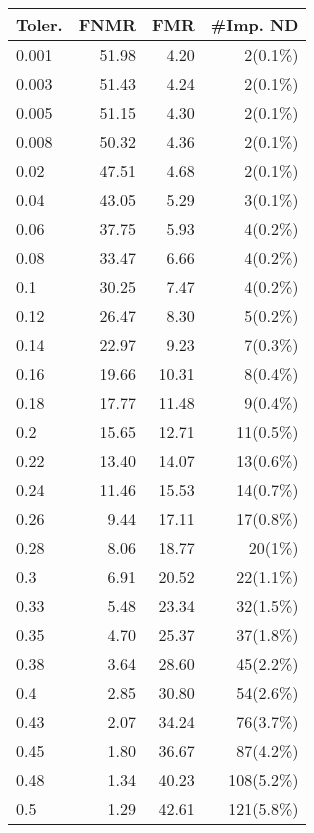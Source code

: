 \begin{table}[htbp]
\centering
\begin{subtable}[h]{0.45\textwidth}
\begin{tabular}{lrrr}
\hline
Toler. & FNMR & FMR & \#Imp. ND  \\ \hline
0.001 & 51.98 & 4.20  & 2(0.1\%)    \\
0.003 & 51.43 & 4.24  & 2(0.1\%)    \\
0.005 & 51.15 & 4.30  & 2(0.1\%)    \\
0.008 & 50.32 & 4.36  & 2(0.1\%)    \\
0.02  & 47.51 & 4.68  & 2(0.1\%)    \\
0.04  & 43.05 & 5.29  & 3(0.1\%)    \\
0.06  & 37.75 & 5.93  & 4(0.2\%)    \\
0.08  & 33.47 & 6.66  & 4(0.2\%)    \\
0.1   & 30.25 & 7.47  & 4(0.2\%)    \\
0.12  & 26.47 & 8.30  & 5(0.2\%)    \\
0.14  & 22.97 & 9.23  & 7(0.3\%)    \\
0.16  & 19.66 & 10.31 & 8(0.4\%)    \\
0.18  & 17.77 & 11.48 & 9(0.4\%)    \\
0.2   & 15.65 & 12.71 & 11(0.5\%)   \\
0.22  & 13.40 & 14.07 & 13(0.6\%)   \\
0.24  & 11.46 & 15.53 & 14(0.7\%)   \\
0.26  & 9.44  & 17.11 & 17(0.8\%)   \\
0.28  & 8.06  & 18.77 & 20(1\%)     \\
0.3   & 6.91  & 20.52 & 22(1.1\%)   \\
0.33  & 5.48  & 23.34 & 32(1.5\%)   \\
0.35  & 4.70  & 25.37 & 37(1.8\%)   \\
0.38  & 3.64  & 28.60 & 45(2.2\%)   \\
0.4   & 2.85  & 30.80 & 54(2.6\%)   \\
0.43  & 2.07  & 34.24 & 76(3.7\%)   \\
0.45  & 1.80  & 36.67 & 87(4.2\%)   \\
0.48  & 1.34  & 40.23 & 108(5.2\%)  \\
0.5   & 1.29  & 42.61 & 121(5.8\%)  \\

\end{tabular}
\end{subtable}
\end{table}
